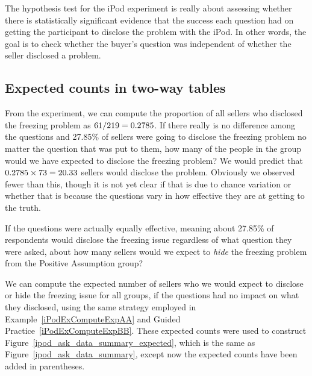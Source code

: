 The hypothesis test for the iPod experiment is really about
assessing whether there is statistically significant evidence
that the success each question had on getting the participant
to disclose the problem with the iPod.
In other words, the goal is to check whether the buyer's
question was independent of whether the seller disclosed
a problem.


\subsection{Expected counts in two-way tables}

\begin{examplewrap}
\begin{nexample}{From the experiment,
    we can compute the proportion of all sellers who disclosed
    the freezing problem as $61{}/219 = 0.2785{}$.
    If there really is no difference among the questions
    and 27.85\% of sellers were going to disclose the freezing
    problem no matter the question that was put to them,
    how many of the \iPodDA{} people in the 
    group would we have expected to disclose the freezing
    problem?} \label{iPodExComputeExpAA}
  We would predict that $0.2785{} \times 73{} = 20.33{}$
  sellers would disclose the problem.
  Obviously we observed fewer than this, though it is not
  yet clear if that is due to chance variation or whether
  that is because the questions vary in how effective they
  are at getting to the truth.
\end{nexample}
\end{examplewrap}

\begin{exercisewrap}
\begin{nexercise}\label{iPodExComputeExpBB}
If the questions were actually equally effective,
meaning about 27.85\% of respondents would disclose the
freezing issue regardless of what question they were asked,
about how many sellers would we expect to \emph{hide} the
freezing problem from the Positive Assumption
group?\footnotemark
\end{nexercise}
\end{exercisewrap}

We can compute the expected number of sellers who we would
expect to disclose or hide the freezing issue for all groups,
if the questions had no impact on what they disclosed,
using the same strategy employed in
Example~\ref{iPodExComputeExpAA} and
Guided Practice~\ref{iPodExComputeExpBB}.
These expected counts were used to construct Figure~\ref{ipod_ask_data_summary_expected},
which is the same as Figure~\ref{ipod_ask_data_summary},
except now the expected counts have been added in parentheses.

